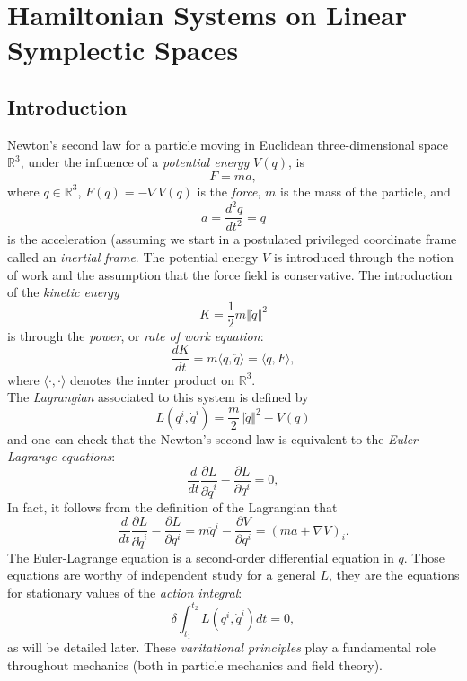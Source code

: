 \chapter{Hamiltonian Systems on Linear Symplectic Spaces}

\section{Introduction}

\qquad Newton's second law for a particle moving in Euclidean three-dimensional space $\mathbb R^3$, under the influence of a \emph{potential energy} $V(q)$, is
$$
F=ma,
$$
where $q\in \mathbb R^3$, $F(q)=-\nabla V(q)$ is the \emph{force}, $m$ is the mass of the particle, and
$$
a=\frac{d^2q}{dt^2}=\ddot q
$$
is the acceleration (assuming we start in a postulated privileged coordinate frame called an \emph{inertial frame}. The potential energy $V$ is introduced through the notion of work and the assumption that the force field is conservative. The introduction of the \emph{kinetic energy}
$$
K=\frac{1}2 m \left\Vert \dot q\right\Vert^2 
$$
is through the \emph{power}, or \emph{rate of work equation}:
$$
\frac{dK}{dt}=m\langle \dot q, \ddot q\rangle=\langle \dot q, F\rangle,
$$
where $\langle \cdot, \cdot \rangle$ denotes the innter product on $\mathbb R^3$.\\

The \emph{Lagrangian} associated to this system is defined by
$$
L(q^i, \dot q^i)=\frac{m}2 \Vert \dot q\Vert^2-V(q)
$$
and one can check that the Newton's second law is equivalent to the \emph{Euler-Lagrange equations}:
$$
\frac{d}{dt} \frac{\partial L}{\partial \dot q^i}-\frac{\partial L}{\partial q^i}=0,
$$
In fact, it follows from the definition of the Lagrangian that
$$
\frac{d}{dt} \frac{\partial L}{\partial \dot q^i}-\frac{\partial L}{\partial q^i}=m\ddot q^i-\frac{\partial V}{\partial q^i}=(ma+\nabla V)_i.
$$
The Euler-Lagrange equation is a second-order differential equation in $q$. Those equations are worthy of independent study for a general $L$, they are the equations for stationary values of the \emph{action integral}:
$$
\delta \int_{t_1}^{t_2}L(q^i, \dot q^i)dt=0,
$$
as will be detailed later. These \emph{varitational principles} play a fundamental role throughout mechanics (both in particle mechanics and field theory).\\

